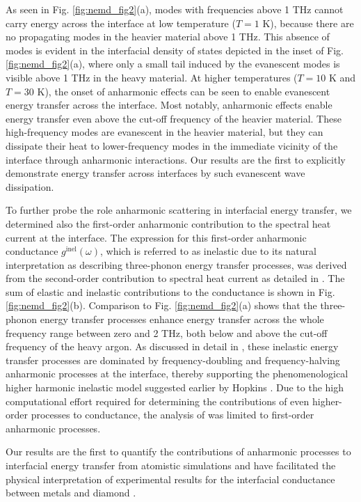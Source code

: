 As seen in Fig. \ref{fig:nemd_fig2}(a), modes with frequencies above 1 THz cannot carry energy across the interface at low temperature ($T=1$ K), because there are no propagating modes in the heavier material above 1 THz. This absence of modes is evident in the interfacial density of states depicted in the inset of Fig. \ref{fig:nemd_fig2}(a), where only a small tail induced by the evanescent modes is visible above 1 THz in the heavy material. At higher temperatures ($T=10$ K and $T=30$ K), the onset of anharmonic effects can be seen to enable evanescent energy transfer across the interface. Most notably, anharmonic effects enable energy transfer even above the cut-off frequency of the heavier material. These high-frequency modes are evanescent in the heavier material, but they can dissipate their heat to lower-frequency modes in the immediate vicinity of the interface through anharmonic interactions. Our results are the first to explicitly demonstrate energy transfer across interfaces by such evanescent wave dissipation.

To further probe the role anharmonic scattering in interfacial energy transfer, we determined also the first-order anharmonic contribution to the spectral heat current at the interface. The expression for this first-order anharmonic conductance $g^{\textrm{inel}}(\omega)$, which is referred to as inelastic due to its natural interpretation as describing three-phonon energy transfer processes, was derived from the second-order contribution to spectral heat current as detailed in . The sum of elastic and inelastic contributions to the conductance is shown in Fig. \ref{fig:nemd_fig2}(b). Comparison to Fig. \ref{fig:nemd_fig2}(a) shows that the three-phonon energy transfer processes enhance energy transfer across the whole frequency range between zero and 2 THz, both below and above the cut-off frequency of the heavy argon. As discussed in detail in , these inelastic energy transfer processes are dominated by frequency-doubling and frequency-halving anharmonic processes at the interface, thereby supporting the phenomenological higher harmonic inelastic model suggested earlier by Hopkins \cite{hopkins09_jap}. Due to the high computational effort required for determining the contributions of even higher-order processes to conductance, the analysis of  was limited to first-order anharmonic processes.

Our results are the first to quantify the contributions of anharmonic processes to interfacial energy transfer from atomistic simulations and have facilitated the physical interpretation of experimental results for the interfacial conductance between metals and diamond \cite{hohensee15}. 

